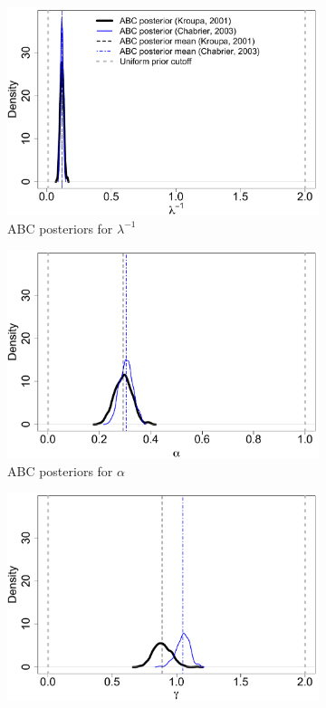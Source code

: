 \documentclass[ejs]{imsart}
\numberwithin{equation}{section}
\theoremstyle{plain}
\begin{document}
\begin{figure}[htbp]
\begin{subfigure}{0.32\textwidth}
\centering
\includegraphics[width = .95\textwidth]{figures/kc_k.pdf} 
\caption{ABC posteriors for $\lambda^{-1}$}\label{subfig:kc_k}
\end{subfigure}
\begin{subfigure}{0.32\textwidth}
\centering
\includegraphics[width = .95\textwidth]{figures/kc_alpha.pdf} 
\caption{ABC posteriors for $\alpha$}\label{subfig:kc_alpha}
\end{subfigure}
\begin{subfigure}{0.32\textwidth}
\centering
\includegraphics[width = .95\textwidth]{figures/kc_gamma.pdf} 

\end{subfigure}
\end{figure}
\end{document}
